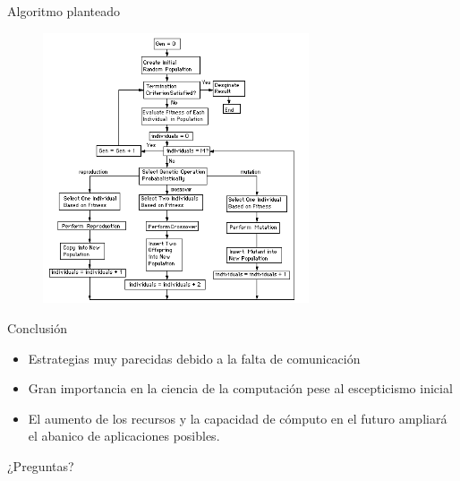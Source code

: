 \documentclass[10pt]{beamer}
\begin{document}
\begin{frame}{Algoritmo planteado}

 \begin{figure}[H]
  \centering
  \includegraphics[width=0.7\textwidth]{imgs/FlowchartGP.PNG}
  \label{fig:dfd:1}
\end{figure}
  
\end{frame}


\begin{frame}{Conclusión}

 \begin{itemize}\itemsep2pt
  \item Estrategias muy parecidas debido a la falta de comunicación
  \item Gran importancia en la ciencia de la computación pese al escepticismo inicial
  \item El aumento de los recursos y la capacidad de cómputo en el futuro ampliará el abanico de aplicaciones posibles.
  \end{itemize}

  
\end{frame}

\begin{frame}[standout]
  ¿Preguntas?
\end{frame}
\end{document}
